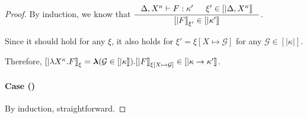 \begin{proof}
By induction, we know that 
$ \inference{\Delta,X^\kappa |- F:\kappa' & \xi'\in[|\Delta,X^\kappa|]}
	{[|F|]_{\xi'} \in [|\kappa'|]} $.

Since it should hold for any $\xi$, it also holds for
$\xi'=\xi[X\mapsto\mathcal{G}]$ for any $\mathcal{G}\in[|\kappa|]$.

Therefore,
$  [|\lambda X^\kappa.F|]_\xi
 = \boldsymbol\lambda(\mathcal{G}\in[|\kappa|]).[|F|]_{\xi[X\mapsto\mathcal{G}]}
 	\in [|\kappa -> \kappa'|]$.

\paragraph{Case ()} By induction, straightforward.
\end{proof}

